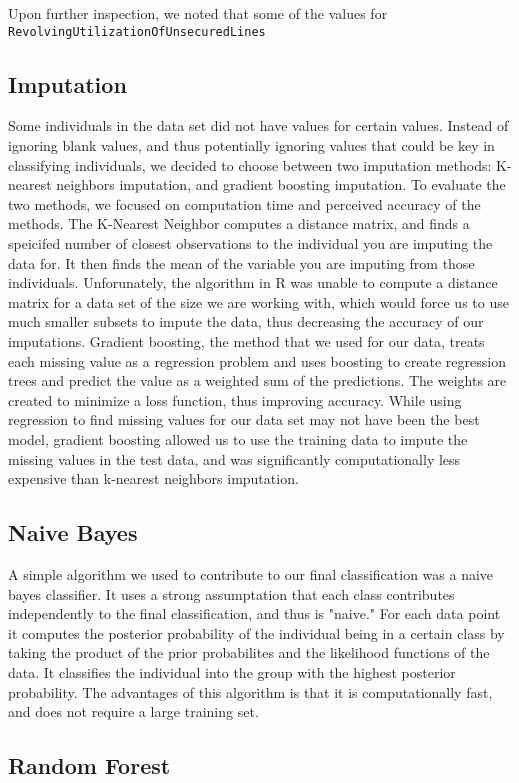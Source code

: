 \documentclass[11pt, oneside]{article}   	%
\begin{document}
	Upon further inspection, we noted that some of the values for \tt RevolvingUtilizationOfUnsecuredLines
	\subsection{Imputation}
	Some individuals in the data set did not have values for certain values. Instead of ignoring blank values, and thus potentially ignoring values that could be key in classifying individuals, we decided to choose between two imputation methods: K-nearest neighbors imputation, and gradient boosting imputation. To evaluate the two methods, we focused on computation time and perceived accuracy of the methods. The K-Nearest Neighbor computes a distance matrix, and finds a speicifed number of closest observations to the individual you are imputing the data for. It then finds the mean of the variable you are imputing from those individuals. Unforunately, the algorithm in R was unable to compute a distance matrix for a data set of the size we are working with, which would force us to use much smaller subsets to impute the data, thus decreasing the accuracy of our imputations. Gradient boosting, the method that we used for our data, treats each missing value as a regression problem and uses boosting to create regression trees and predict the value as a weighted sum of the predictions. The weights are created to minimize a loss function, thus improving accuracy. While using regression to find missing values for our data set may not have been the best model, gradient boosting allowed us to use the training data to impute the missing values in the test data, and was significantly computationally less expensive than k-nearest neighbors imputation. 
	\subsection{Naive Bayes}
	A simple algorithm we used to contribute to our final classification was a naive bayes classifier. It uses a strong assumptation that each class contributes independently to the final classification, and thus is "naive." For each data point it computes the posterior probability of the individual being in a certain class by taking the product of the prior probabilites and the likelihood functions of the data. It classifies the individual into the group with the highest posterior probability. The advantages of this algorithm is that it is computationally fast, and does not require a large training set. 
	\subsection{Random Forest}
\end{document}
